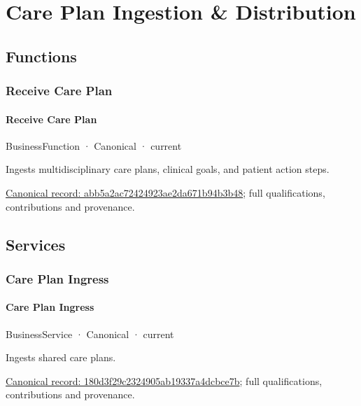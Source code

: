 \section{Care Plan Ingestion \& Distribution}

\subsection{Functions}

\subsubsection{Receive Care Plan}

\paragraph{Receive Care Plan}

\label{element:abb5a2ac72424923ae2da671b94b3b48}
{\small BusinessFunction · Canonical · current}\par

Ingests multidisciplinary care plans, clinical goals, and patient action steps.


{\footnotesize \href{../../../../continuum/business/business-function/abb5a2ac72424923ae2da671b94b3b48.md}{Canonical record: abb5a2ac72424923ae2da671b94b3b48}; full qualifications, contributions and provenance.}\par
\subsection{Services}

\subsubsection{Care Plan Ingress}

\paragraph{Care Plan Ingress}

\label{element:180d3f29c2324905ab19337a4dcbce7b}
{\small BusinessService · Canonical · current}\par

Ingests shared care plans.


{\footnotesize \href{../../../../continuum/business/business-service/180d3f29c2324905ab19337a4dcbce7b.md}{Canonical record: 180d3f29c2324905ab19337a4dcbce7b}; full qualifications, contributions and provenance.}\par
